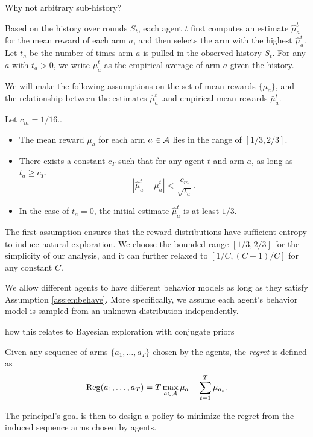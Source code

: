 \begin{remark}
  Why not arbitrary sub-history? 
\end{remark}

 Based on the history over rounds $S_t$, each
agent $t$ first computes an estimate $\hat{\mu}_a^t$ for the mean
reward of each arm $a$, and then selects the arm with the highest
$\hat{\mu}_a^t$. Let $t_a$ be the number of times arm $a$ is pulled in
the observed history $S_t$. For any $a$ with $t_a > 0$, we write
$\bar{\mu}_a^t$ as the empirical average of arm $a$ given the history.


We will make the following assumptions on the set of mean rewards
$\{\mu_a\}$, and the relationship between the estimates $\hat \mu_a^t$
.and empirical mean rewards $\bar\mu_a^t$.



\begin{assumption}
\label{ass:embehave}
Let $c_m = 1/16$.. 
\begin{itemize}
\item The mean reward $\mu_a$ for each arm $a\in \mathcal{A}$ lies in the range
  of $[1/3, 2/3]$.


\item There exists a constant $c_T$ such that for any agent $t$ and
  arm $a$, as long as $t_a \geq c_T$,
\[
  \left|\hat{\mu}^t_a - \bar{\mu}^t_a \right| <
  \frac{c_m}{\sqrt{t_a}}.
\]
\item In the case of $t_a = 0$, the initial estimate $\hat{\mu}^t_a$
  is at least $1/3$.
\end{itemize}
\end{assumption}


The first assumption ensures that the reward distributions have
sufficient entropy to induce natural exploration. We choose the
bounded range $[1/3, 2/3]$ for the simplicity of our analysis, and it
can further relaxed to $[1/C, (C-1)/C]$ for any constant $C$.


We allow different agents to have different behavior models as long as
they satisfy Assumption \ref{ass:embehave}. More specifically, we
assume each agent's behavior model is sampled from an unknown
distribution independently.
\begin{remark}
how this relates to Bayesian exploration with conjugate priors
\end{remark}


Given any sequence of arms $\{a_1, \ldots, a_T\}$ chosen by the agents, the \emph{regret} is defined as
\[
  \mathrm{Reg}(a_1, \ldots , a_T) = T \max_{a\in \mathcal{A}} \mu_a - \sum_{t=1}^T
  \mu_{a_t}.
\]

The principal's goal is then to design a policy to minimize the regret
from the induced sequence arms chosen by agents.


